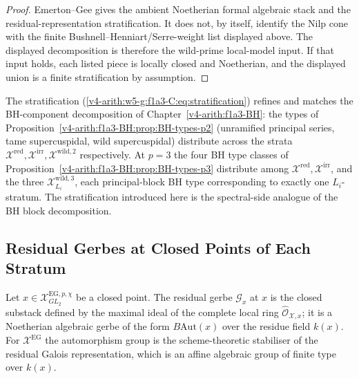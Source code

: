 \begin{proof}
Emerton--Gee gives the ambient Noetherian formal algebraic stack and
the residual-representation stratification. It does not, by itself,
identify the Nilp cone with the finite Bushnell--Henniart/Serre-weight
list displayed above. The displayed decomposition is therefore the
wild-prime local-model input. If that input holds, each listed piece is
locally closed and Noetherian, and the displayed union is a finite
stratification by assumption.
\end{proof}

\begin{remark}
\label{v4-arith:w5-g:f1a3-C:rem:BH-correspondence}
The stratification
(\ref{v4-arith:w5-g:f1a3-C:eq:stratification}) refines and matches
the BH-component decomposition of
Chapter~\ref{v4-arith:f1a3-BH}: the types of
Proposition~\ref{v4-arith:f1a3-BH:prop:BH-types-p2} (unramified principal
series, tame supercuspidal, wild supercuspidal) distribute across
the strata \(\mathcal{X}^{\mathrm{red}},\mathcal{X}^{\mathrm{irr}},\mathcal{X}^{\mathrm{wild},2}\)
respectively. At \(p=3\) the four BH type classes of
Proposition~\ref{v4-arith:f1a3-BH:prop:BH-types-p3} distribute among
\(\mathcal{X}^{\mathrm{red}},\mathcal{X}^{\mathrm{irr}}\), and the three
\(\mathcal{X}^{\mathrm{wild},3}_{L_{i}}\), each principal-block BH type
corresponding to exactly one \(L_{i}\)-stratum. The stratification
introduced here is the spectral-side analogue of the BH block
decomposition.
\end{remark}

\subsection{Residual Gerbes at Closed Points of Each Stratum}

\begin{proposition}
\label{v4-arith:w5-g:f1a3-C:prop:residual-gerbe}
Let
\(x\in\mathcal{X}^{\mathrm{EG},p,\chi}_{GL_{2}}\) be a closed point.
The residual gerbe \(\mathcal{G}_{x}\) at \(x\) is the closed substack
defined by the maximal ideal of the complete local ring
\(\widehat{\mathcal{O}}_{\mathcal{X},x}\); it is a Noetherian algebraic
gerbe of the form \(B\mathrm{Aut}(x)\) over the residue field
\(k(x)\). For \(\mathcal{X}^{\mathrm{EG}}\) the automorphism group is
the scheme-theoretic stabiliser of the residual Galois representation,
which is an affine algebraic group of finite type over \(k(x)\).
\end{proposition}

